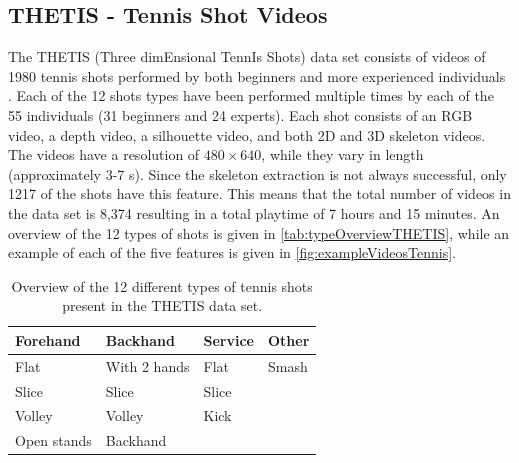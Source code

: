 \subsection{THETIS - Tennis Shot Videos}
The THETIS (Three dimEnsional TennIs Shots) data set consists of videos of 1980 tennis shots performed by both beginners and more experienced individuals \cite{Gourgari2013}. Each of the 12 shots types have been performed multiple times by each of the 55 individuals (31 beginners and 24 experts). Each shot consists of an RGB video, a depth video, a silhouette video, and both 2D and 3D skeleton videos. The videos have a resolution of $480\times 640$, while they vary in length (approximately 3-7 s). Since the skeleton extraction is not always successful, only 1217 of the shots have this feature. This means that the total number of videos in the data set is 8,374 resulting in a total playtime of 7 hours and 15 minutes. An overview of the 12 types of shots is given in \autoref{tab:typeOverviewTHETIS}, while an example of each of the five features is given in \autoref{fig:exampleVideosTennis}. 

\begin{table}
\centering
\caption{Overview of the 12 different types of tennis shots present in the THETIS data set.}
\label{tab:typeOverviewTHETIS}
\begin{tabular}{l|l|l|l}
\textbf{Forehand}    & \textbf{Backhand}     & \textbf{Service} & \textbf{Other} \\ \hline
Flat        & With 2 hands & Flat    & Smash \\
Slice       & Slice        & Slice   &       \\
Volley      & Volley       & Kick    &       \\
Open stands & Backhand     &         &      
\end{tabular}
\end{table}

